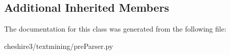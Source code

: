 \subsection*{Additional Inherited Members}


The documentation for this class was generated from the following file\-:\begin{DoxyCompactItemize}
\item 
cheshire3/textmining/pre\-Parser.\-py\end{DoxyCompactItemize}
